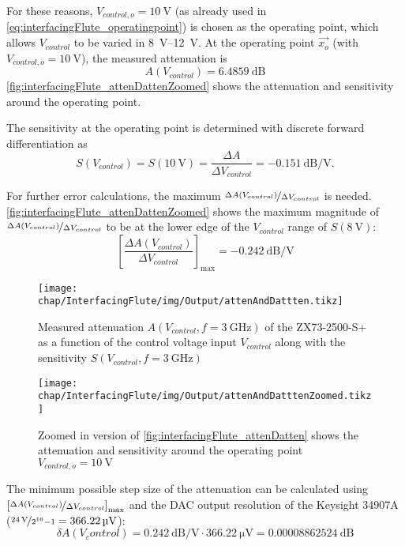 For these reasons, $V_{control,o}=\SI{10}{\volt}$ (as already used in \autoref{eq:interfacingFlute_operatingpoint}) is chosen as the operating point, which allows $V_{control}$ to be varied in \SIrange{8}{12}{\volt}.
At the operating point $\vec{x_o}$ (with $V_{control,o}=\SI{10}{\volt}$), the measured attenuation is
\begin{equation}
A(V_{control})=\SI{6.4859}{\dB}
\end{equation}
\autoref{fig:interfacingFlute_attenDattenZoomed} shows the attenuation and sensitivity around the operating point.

The sensitivity at the operating point is determined with discrete forward differentiation as
\begin{equation}
S(V_{control})=S(\SI{10}{\volt})=\frac{\Delta A}{\Delta V_{control}} = \SI{-0.151}{\dB\per\volt}.
\end{equation}

For further error calculations, the maximum $\nicefrac{\Delta A(V_{control})}{\Delta V_{control}}$ is needed. \autoref{fig:interfacingFlute_attenDattenZoomed} shows the maximum magnitude of $\nicefrac{\Delta A(V_{control})}{\Delta V_{control}}$ to be at the lower edge of the $V_{control}$ range of $S(\SI{8}{\volt})$:
\begin{equation}
\left[\frac{\Delta A(V_{control})}{\Delta V_{control}}\right]_{\text{max}}=\SI{-0.242}{\dB\per\volt}
\end{equation}

\begin{figure}[tb]
	\centering
	\texttt{[image: chap/InterfacingFlute/img/Output/attenAndDattten.tikz]}
	\caption{Measured attenuation $A(V_{control},f=\SI{3}{\GHz})$ of the ZX73-2500-S+ as a function of the control voltage input $V_{control}$ along with the sensitivity $S(V_{control},f=\SI{3}{\GHz})$}
	\label{fig:interfacingFlute_attenDatten}
\end{figure}

\begin{figure}[tb]
	\centering
	\texttt{[image: chap/InterfacingFlute/img/Output/attenAndDatttenZoomed.tikz]}
	\caption{Zoomed in version of \autoref{fig:interfacingFlute_attenDatten} shows the attenuation and sensitivity around the operating point $V_{control,o}=\SI{10}{\volt}$}
	\label{fig:interfacingFlute_attenDattenZoomed}
\end{figure}

The minimum possible step size of the attenuation can be calculated using $\left[\nicefrac{\Delta A(V_{control})}{\Delta V_{control}}\right]_{\text{max}}$ and the DAC output resolution of the Keysight 34907A ($\nicefrac{\SI{24}{\volt}}{2^{16}-1}=\SI{366.22}{\micro\volt}$):
\begin{equation}
\delta A(V_control) = \SI{0.242}{\dB\per\volt} \cdot \SI{366.22}{\micro\volt} = \SI{0.00008862524}{\dB}
\end{equation}

